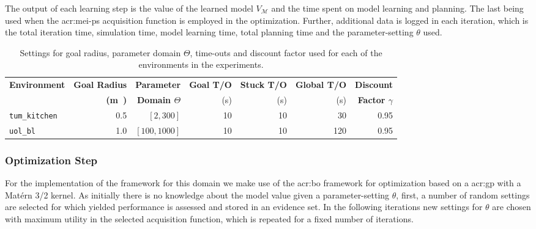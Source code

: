 The output of each learning step is the value of the learned model $V_\mathcal{M}$ and the time spent on model learning and planning.
The last being used when the \acrshort{acr:mei-ps} acquisition function is employed in the optimization.
Further, additional data is logged in each iteration, which is the total iteration time, simulation time, model learning time, total planning time and the parameter-setting $\theta$ used.


\begin{table}
	\caption{Settings for goal radius, parameter domain $\Theta$, time-outs and discount factor used for each of the environments in the experiments.}
	\label{tab:designer-settings}\centering
	\begin{tabular}{|l|r|r|r|r|r|r|}
		\hline
		\textbf{Environment} & \textbf{Goal Radius} & \textbf{Parameter} & \textbf{Goal T/O} & \textbf{Stuck T/O} & \textbf{Global T/O} & \textbf{Discount}  \\
		
		& \textbf{(\si\meter)} & \textbf{Domain $\Theta$} & (\si{\second}) & (\si{\second}) & (\si{\second}) & \textbf{Factor $\gamma$}\\
		\hline
		\texttt{tum\_kitchen} & \num{0.5} & $[2, 300]$ & \num{10} & \num{10} & \num{30} & \num{0.95} \\
		\hline
		\texttt{uol\_bl} & \num{1.0} & $[100, 1000]$ & \num{10} & \num{10} & \num{120} & \num{0.95}\\
		\hline
	\end{tabular}
\end{table}

\subsubsection{Optimization Step}

For the implementation of the framework for this domain we make use of the \acrshort{acr:bo} framework for optimization based on a \acrshort{acr:gp} with a Mat\'ern 3/2 kernel.
As initially there is no knowledge about the model value given a parameter-setting $\theta$, first, a number of random settings are selected for which yielded performance is assessed and stored in an evidence set.
In the following iterations new settings for $\theta$ are chosen with maximum utility in the selected acquisition function, which is repeated for a fixed number of iterations.


